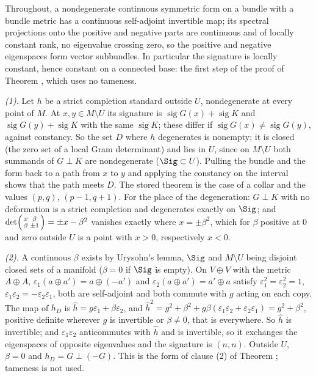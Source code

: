 Throughout, a nondegenerate continuous symmetric form on a bundle with a bundle metric has a continuous self-adjoint invertible map; its spectral projections onto the positive and negative parts are continuous and of locally constant rank, no eigenvalue crossing zero, so the positive and negative eigenspaces form vector subbundles. In particular the signature is locally constant, hence constant on a connected base: the first step of the proof of Theorem , which uses no tameness.

\emph{(1).} Let $h$ be a strict completion standard outside $U$, nondegenerate at every point of $M$. At $x, y \in M \setminus U$ its signature is $\operatorname{sig} G(x) + \operatorname{sig} K$ and $\operatorname{sig} G(y) + \operatorname{sig} K$ with the same $\operatorname{sig} K$; these differ if $\operatorname{sig} G(x) \neq \operatorname{sig} G(y)$, against constancy. So the set $D$ where $h$ degenerates is nonempty; it is closed (the zero set of a local Gram determinant) and lies in $U$, since on $M \setminus U$ both summands of $G \perp K$ are nondegenerate ($\Sig \subset U$). Pulling the bundle and the form back to a path from $x$ to $y$ and applying the constancy on the interval shows that the path meets $D$. The stored theorem is the case of a collar and the values $(p,q)$, $(p-1,q+1)$. For the place of the degeneration: $G \perp K$ with no deformation is a strict completion and degenerates exactly on $\Sig$; and $\det\begin{psmallmatrix} x & \beta \\ \beta & \pm 1\end{psmallmatrix} = \pm x - \beta^{2}$ vanishes exactly where $x = \pm\beta^{2}$, which for $\beta$ positive at $0$ and zero outside $U$ is a point with $x > 0$, respectively $x < 0$.

\emph{(2).} A continuous $\beta$ exists by Urysohn's lemma, $\Sig$ and $M \setminus U$ being disjoint closed sets of a manifold ($\beta = 0$ if $\Sig$ is empty). On $V \oplus V$ with the metric $A \oplus A$, $\varepsilon_{1}(a \oplus a') = a \oplus (-a')$ and $\varepsilon_{2}(a \oplus a') = a' \oplus a$ satisfy $\varepsilon_{1}^{2} = \varepsilon_{2}^{2} = 1$, $\varepsilon_{1}\varepsilon_{2} = -\varepsilon_{2}\varepsilon_{1}$, both are self-adjoint and both commute with $g$ acting on each copy. The map of $h_{D}$ is $\hat h = g\varepsilon_{1} + \beta\varepsilon_{2}$, and $\hat h^{2} = g^{2} + \beta^{2} + g\beta(\varepsilon_{1}\varepsilon_{2} + \varepsilon_{2}\varepsilon_{1}) = g^{2} + \beta^{2}$, positive definite wherever $g$ is invertible or $\beta \neq 0$, that is everywhere. So $\hat h$ is invertible; and $\varepsilon_{1}\varepsilon_{2}$ anticommutes with $\hat h$ and is invertible, so it exchanges the eigenspaces of opposite eigenvalues and the signature is $(n,n)$. Outside $U$, $\beta = 0$ and $h_{D} = G \perp (-G)$. This is the form of clause (2) of Theorem ; tameness is not used.

